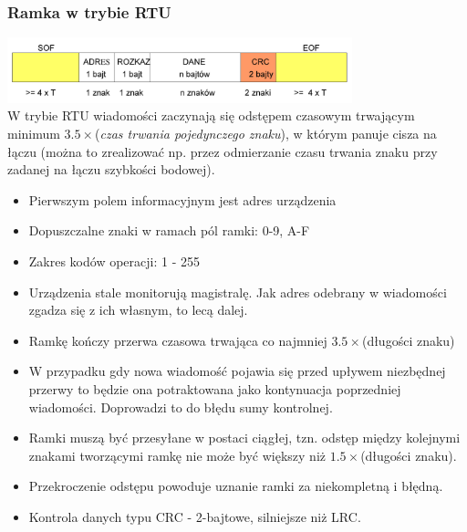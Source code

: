 \documentclass[a4paper,twoside]{article}
\begin{document}
		\subsubsection{Ramka w trybie RTU}
			\includegraphics[width=10cm]{./wyklady/RS232_18_2.pdf}\\
			W trybie RTU wiadomości zaczynają się odstępem czasowym trwającym minimum $3.5\times$(\emph{czas trwania pojedynczego znaku}), w którym panuje cisza na łączu (można to zrealizować np. przez odmierzanie czasu trwania znaku przy zadanej na łączu szybkości bodowej).
			\begin{itemize}
				\item Pierwszym polem informacyjnym jest adres urządzenia
				\item Dopuszczalne znaki w ramach pól ramki: 0-9, A-F
				\item Zakres kodów operacji: 1 - 255
				\item Urządzenia stale monitorują magistralę. Jak adres odebrany w wiadomości zgadza się z ich własnym, to lecą dalej.
				\item Ramkę kończy przerwa czasowa trwająca co najmniej $3.5\times$(długości znaku)
				\item W przypadku gdy nowa wiadomość pojawia się przed upływem niezbędnej przerwy to będzie ona potraktowana jako kontynuacja poprzedniej wiadomości. Doprowadzi to do błędu sumy kontrolnej.
				\item Ramki muszą być przesyłane w postaci ciągłej, tzn. odstęp między kolejnymi znakami tworzącymi ramkę nie może być większy niż $1.5\times$(długości znaku).
				\item Przekroczenie odstępu powoduje uznanie ramki za niekompletną i błędną.
				\item Kontrola danych typu CRC - 2-bajtowe, silniejsze niż LRC.
			\end{itemize}
\end{document}
